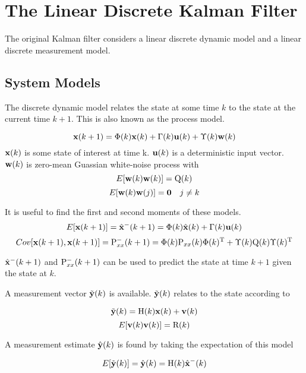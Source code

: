 \section{The Linear Discrete Kalman Filter}

The original Kalman filter considers a linear discrete dynamic model and a linear discrete measurement model.

\subsection{System Models}
The discrete dynamic model relates the state at some time $ k $ to the state at the current time $ k+1 $.
This is also known as the process model.

\begin{equation}
\mathrm{\mathbf{x}}(k+1)=\Phi(k)\mathrm{\mathbf{x}}(k)+\Gamma(k)\mathrm{\mathbf{u}}(k) + \Upsilon(k)\mathrm{\mathbf{w}}(k)
\end{equation}
$\mathrm{\mathbf{x}}(k)$ is some state of interest at time k.
$\mathrm{\mathbf{u}}(k)$ is a deterministic input vector.
$\mathrm{\mathbf{w}}(k) $ is zero-mean Guassian white-noise process with 
\begin{equation}
E[\mathrm{\mathbf{w}}(k)\mathrm{\mathbf{w}}(k)]=\mathrm{Q}(k) 
\end{equation}
\begin{equation}
E[\mathrm{\mathbf{w}}(k)\mathrm{\mathbf{w}}(j)]=\mathbf{0}  \quad j \neq k
\end{equation}

It is useful to find the first and second moments of these models.
\begin{equation}
E[\mathrm{\mathbf{x}}(k+1)]=\hat{\mathrm{\mathbf{x}}}^-(k+1)  =\Phi(k)\hat{\mathrm{\mathbf{x}}}(k)+\Gamma(k)\mathrm{\mathbf{u}}(k)
\end{equation}
\begin{equation}
Cov[\mathrm{\mathbf{x}}(k+1),\mathrm{\mathbf{x}}(k+1)]=\mathrm{P}_{xx}^-(k+1) =\Phi(k)\mathrm{P}_{xx}(k)\Phi(k)^{\mathrm{T}} +\Upsilon(k)\mathrm{Q}(k)\Upsilon(k)^{\mathrm{T}} 
\end{equation}

$ \hat{\mathrm{\mathbf{x}}}^-(k+1) $ and $ \mathrm{P}_{xx}^-(k+1) $ can be used to predict the state at time $ k+1 $ given the state at $ k$.

A measurement vector $ \tilde{\mathrm{\mathbf{y}}}(k) $ is available.
$ \tilde{\mathrm{\mathbf{y}}}(k) $ relates to the state according to 

\begin{equation}
\tilde{\mathrm{\mathbf{y}}}(k)=\mathrm{H}(k)\mathrm{\mathbf{x}}(k)+\mathrm{\mathbf{v}}(k)
\end{equation}
\begin{equation}
E[\mathrm{\mathbf{v}}(k)\mathrm{\mathbf{v}}(k)]=\mathrm{R}(k) 
\end{equation}

A measurement estimate $ \hat{\mathrm{\mathbf{y}}}(k) $ is found by taking the expectation of this model

\begin{equation}
E[\tilde{\mathrm{\mathbf{y}}}(k)]=\hat{\mathrm{\mathbf{y}}}(k)=\mathrm{H}(k)\hat{\mathrm{\mathbf{x}}}^-(k)
\end{equation}

